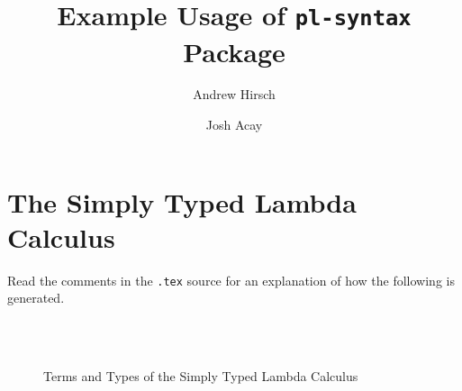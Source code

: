 \documentclass{article}
\title{Example Usage of \texttt{pl-syntax} Package}
\author{Andrew Hirsch \and Josh Acay}
\begin{document}
\maketitle

\section{The Simply Typed Lambda Calculus}

Read the comments in the \texttt{.tex} source for an explanation of how
the following is generated.

\begin{figure}[h]
  \begin{syntax}




    \separate

    \category[Types]{\tau}
    \\
    \\

    \category[Contexts]{\Gamma}


  \end{syntax}

  \caption{Terms and Types of the Simply Typed Lambda Calculus}
  \label{fig:abstract-syntax}
\end{figure}
\end{document}
